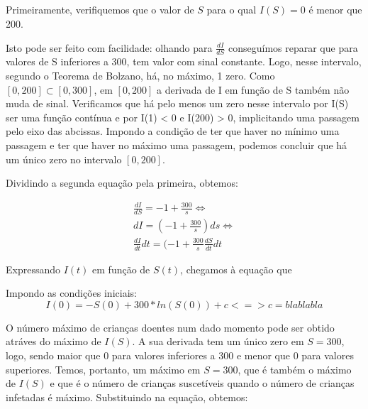 \documentclass[portuguese, a4paper]{article}
\begin{document}
	\subsection{}
		\subsubsection{}
		\par %
		Primeiramente, verifiquemos que o valor de $S$ para o qual $I(S) = 0$ é menor que 200.
		\par
		Isto pode ser feito com facilidade: olhando para $\frac{dI}{dS}$ conseguímos reparar que para valores
		de S inferiores a 300, tem valor com sinal constante. Logo, nesse intervalo, segundo o Teorema de Bolzano,
		há, no máximo, 1 zero. Como $[0, 200] \subset [0, 300]$, em $[0, 200]$ a derivada de I em função de S também não muda de sinal.
		Verificamos que há pelo menos um zero nesse intervalo por I(S) ser uma função contínua e por I(1) < 0 e I(200) > 0, 
		implicitando uma passagem pelo eixo das abcissas. Impondo a condição de ter que haver no mínimo uma passagem e ter que haver no máximo uma passagem, 
		podemos concluir que há um único zero no intervalo $[0, 200]$.
		\par
		Dividindo a segunda equação pela primeira, obtemos:

		\begin{equation} \label{di}
		\begin{split}
			\frac{dI}{dS} = -1 + \frac{300}{s} \Leftrightarrow \\
			dI = ( -1 + \frac{300}{s})ds \Leftrightarrow \\
			\frac{dI}{dt} dt = (-1 + \frac{300}{s} \frac{dS}{dt} dt
		\end{split}
		\end{equation}


		Expressando $I(t)$ em função de $S(t)$, chegamos à equação que

		Impondo as condições iniciais:
		$$I(0) = -S(0) + 300* ln(S(0)) + c <=> c = bla bla bla$$


		O número máximo de crianças doentes num dado momento pode ser obtido
		atráves do máximo de $I(S)$. A sua derivada tem um único zero em $S = 300$,
		logo, sendo maior que 0 para valores inferiores a 300 e menor que 0 para valores superiores.
		Temos, portanto, um máximo em $S = 300$, que é também o máximo de $I(S)$ e que é
		o número de crianças suscetíveis quando o número de crianças infetadas é máximo.
		Substituindo na equação, obtemos:
\end{document}

